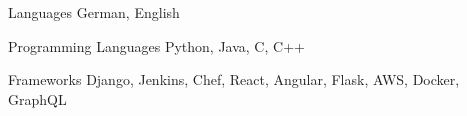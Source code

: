 
\begin{cvskills}
\cvskill
    {Languages} %
    {German, English} %

  \cvskill
    {Programming Languages} %
    {Python, Java, C, C++} %

  \cvskill
    {Frameworks} %
    {Django, Jenkins, Chef, React, Angular, Flask, AWS, Docker, GraphQL} %
\end{cvskills}